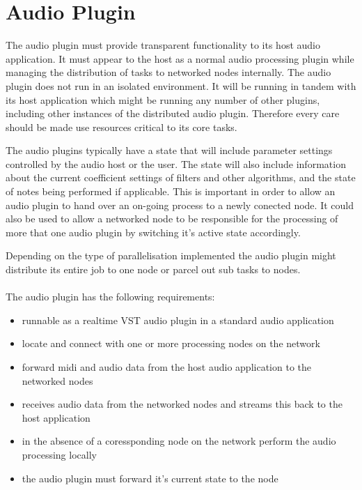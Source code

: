 \section{Audio Plugin}

The audio plugin must provide transparent functionality to its host audio application. It must appear to the host as a normal audio processing plugin while managing the distribution of tasks to networked nodes internally. The audio plugin does not run in an isolated environment. It will be running in tandem with its host application which might be running any number of other plugins, including other instances of the distributed audio plugin. Therefore every care should be made use resources critical to its core tasks.

The audio plugins typically have a state that will include parameter settings controlled by the audio host or the user. The state will also include information about the current coefficient settings of filters and other algorithms, and the state of notes being performed if applicable. This is important in order to allow an audio plugin to hand over an on-going process to a newly conected node. It could also be used to allow a networked node to be responsible for the processing of more that one audio plugin by switching it's active state accordingly.

Depending on the type of parallelisation implemented the audio plugin might distribute its entire job to one node or parcel out sub tasks to nodes.\\
\\
\noindent
The audio plugin has the following requirements:

\begin{itemize}

\item runnable as a realtime VST audio plugin in a standard audio application
\item locate and connect with one or more processing nodes on the network
\item forward midi and audio data from the host audio application to the networked nodes
\item receives audio data from the networked nodes and streams this back to the host application
\item in the absence of a coressponding node on the network perform the audio processing locally
\item the audio plugin must forward it's current state to the node

\end{itemize}

